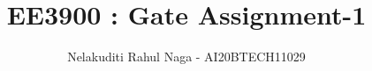 \documentclass[journal,12pt,twocolumn]{IEEEtran}
\DeclareMathOperator*{\Res}{Res}
\begin{document}
\newcommand{\BEQA}{\begin{eqnarray}}
\newcommand{\EEQA}{\end{eqnarray}}
\newcommand{\define}{\stackrel{\triangle}{=}}

\raggedbottom
\setlength{\parindent}{0pt}
\providecommand{\mbf}{\mathbf}
\providecommand{\pr}[1]{\ensuremath{\Pr\left(#1\right)}}
\providecommand{\qfunc}[1]{\ensuremath{Q\left(#1\right)}}
\providecommand{\sbrak}[1]{\ensuremath{{}\left[#1\right]}}
\providecommand{\lsbrak}[1]{\ensuremath{{}\left[#1\right.}}
\providecommand{\rsbrak}[1]{\ensuremath{{}\left.#1\right]}}
\providecommand{\brak}[1]{\ensuremath{\left(#1\right)}}
\providecommand{\lbrak}[1]{\ensuremath{\left(#1\right.}}
\providecommand{\rbrak}[1]{\ensuremath{\left.#1\right)}}
\providecommand{\cbrak}[1]{\ensuremath{\left\{#1\right\}}}
\providecommand{\lcbrak}[1]{\ensuremath{\left\{#1\right.}}
\providecommand{\rcbrak}[1]{\ensuremath{\left.#1\right\}}}
\theoremstyle{remark}
\newtheorem{rem}{Remark}
\newcommand{\sgn}{\mathop{\mathrm{sgn}}}
\providecommand{\abs}[1]{\vert#1\vert}
\providecommand{\res}[1]{\Res\displaylimits_{#1}} 
\providecommand{\norm}[1]{\lVert#1\rVert}
\providecommand{\mtx}[1]{\mathbf{#1}}
\providecommand{\mean}[1]{E[ #1 ]}
\providecommand{\fourier}{\overset{\mathcal{F}}{ \rightleftharpoons}}
\providecommand{\system}{\overset{\mathcal{H}}{ \longleftrightarrow}}
\newcommand{\solution}{\noindent \textbf{Solution: }}
\newcommand{\cosec}{\,\text{cosec}\,}
\providecommand{\dec}[2]{\ensuremath{\overset{#1}{\underset{#2}{\gtrless}}}}
\newcommand{\myvec}[1]{\ensuremath{\begin{pmatrix}#1\end{pmatrix}}}
\newcommand{\mydet}[1]{\ensuremath{\begin{vmatrix}#1\end{vmatrix}}}
\makeatletter
{}
\makeatother
\let\StandardTheFigure\thefigure
\let\vec\mathbf
\renewcommand{\thefigure}{\theproblem}
\def\putbox#1#2#3{\makebox[0in][l]{\makebox[#1][l]{}\raisebox{\baselineskip}[0in][0in]{\raisebox{#2}[0in][0in]{#3}}}}
     \def\rightbox#1{\makebox[0in][r]{#1}}
     \def\centbox#1{\makebox[0in]{#1}}
     \def\topbox#1{\raisebox{-\baselineskip}[0in][0in]{#1}}
     \def\midbox#1{\raisebox{-0.5\baselineskip}[0in][0in]{#1}}
\vspace{3cm}
\title{ EE3900 : Gate Assignment-1}
\author{Nelakuditi Rahul Naga - AI20BTECH11029}
\maketitle
\newpage
\bigskip
\renewcommand{\thefigure}{\theenumi}
\renewcommand{\thetable}{\theenumi}
\end{document}

